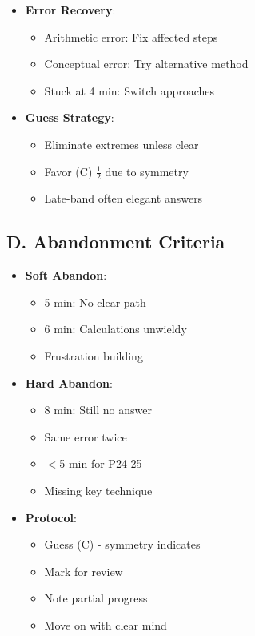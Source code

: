 \documentclass[11pt]{article}
\begin{document}
\begin{competitionbox}
\begin{itemize}[leftmargin=*]
    \item \textbf{Error Recovery}:
    \begin{itemize}
        \item Arithmetic error: Fix affected steps
        \item Conceptual error: Try alternative method
        \item Stuck at 4 min: Switch approaches
    \end{itemize}
    
    \item \textbf{Guess Strategy}:
    \begin{itemize}
        \item Eliminate extremes unless clear
        \item Favor (C) $\frac{1}{2}$ due to symmetry
        \item Late-band often elegant answers
    \end{itemize}
\end{itemize}

\subsection*{D. Abandonment Criteria}
\begin{itemize}[leftmargin=*]
    \item \textbf{Soft Abandon}:
    \begin{itemize}
        \item 5 min: No clear path
        \item 6 min: Calculations unwieldy
        \item Frustration building
    \end{itemize}
    
    \item \textbf{Hard Abandon}:
    \begin{itemize}
        \item 8 min: Still no answer
        \item Same error twice
        \item $<$5 min for P24-25
        \item Missing key technique
    \end{itemize}
    
    \item \textbf{Protocol}:
    \begin{itemize}
        \item Guess (C) - symmetry indicates
        \item Mark for review
        \item Note partial progress
        \item Move on with clear mind
    \end{itemize}
\end{itemize}
\end{competitionbox}
\end{document}
